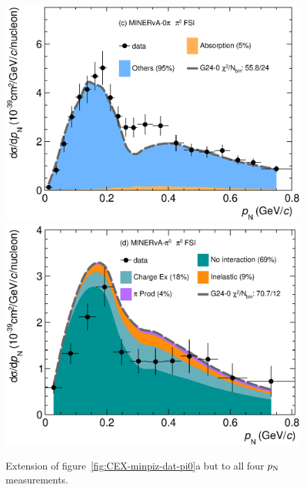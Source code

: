 \begin{figure}[!htb]
    \includegraphics[width=\dbfigwid\textwidth]{figures/tuning/0000-min_0pi_pn_pi0_decomp.eps}
    \includegraphics[width=\dbfigwid\textwidth]{figures/tuning/0000-min_pi0_pn_pi0_decomp.eps}
    \caption{\label{fig:g24-0-pn-pi0}  Extension of figure~\ref{fig:CEX-minpiz-dat-pi0}a but to all four $p_\textrm{N}$ measurements. } 
\end{figure}

